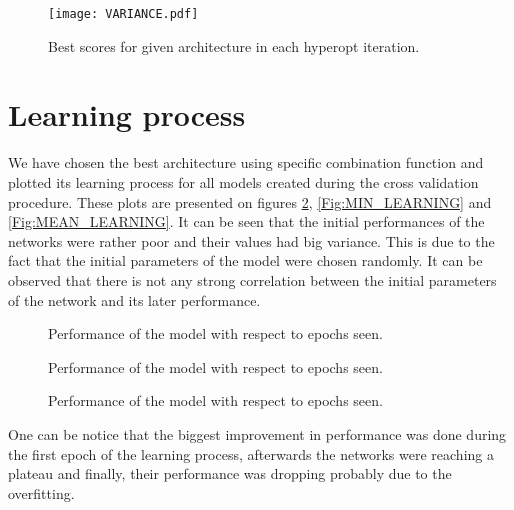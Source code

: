 \documentclass[a4paper,10pt]{report}
\begin{document}
      \begin{figure}[h!]
	\centering
	\texttt{[image: VARIANCE.pdf]}
	\caption{Best scores for given architecture in each hyperopt iteration.}
	\label{VARIANCE}
      \end{figure}
      
    \section{Learning process}

    We have chosen the best architecture using specific combination function and plotted its learning process for all models created during the cross validation procedure. These plots are presented on figures \ref{Fig:SOFT_LEARNING}, \ref{Fig:MIN_LEARNING} and \ref{Fig:MEAN_LEARNING}. It can be seen that the initial performances of the networks were rather poor and their values had big variance. This is due to the fact that the initial parameters of the model were chosen randomly. It can be observed that there is not any strong correlation between the initial parameters of the network and its later performance. 
    
    \begin{figure}[!htb]\centering
      \begin {minipage}{\textwidth}
	\caption{Performance of the model with respect to epochs seen.}\label{Fig:MEAN_LEARNING}
      \end{minipage}
      
      \begin{minipage}{0.49\textwidth}
	\caption{Performance of the model with respect to epochs seen.}\label{Fig:MIN_LEARNING}
      \end{minipage}
      \begin {minipage}{0.49\textwidth}
	\caption{Performance of the model with respect to epochs seen.}\label{Fig:SOFT_LEARNING}
      \end{minipage}
    \end{figure}
    
    One can be notice that the biggest improvement in performance was done during the first epoch of the learning process, afterwards the networks were reaching a plateau and finally, their performance was dropping probably due to the overfitting.
\end{document}

